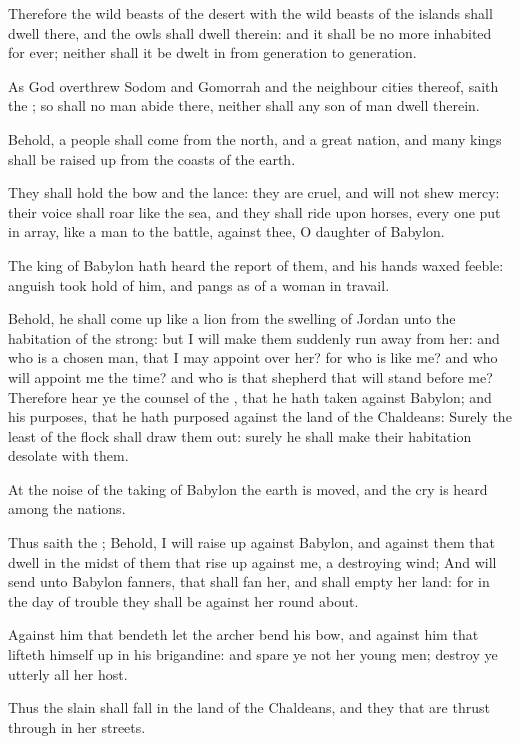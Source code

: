 \Verse Therefore the wild beasts of the desert with the wild beasts of the islands shall dwell there, and the owls shall dwell therein: and it shall be no more inhabited for ever; neither shall it be dwelt in from generation to generation.

\Verse As God overthrew Sodom and Gomorrah and the neighbour cities thereof, saith the \LORD; so shall no man abide there, neither shall any son of man dwell therein.

\Verse Behold, a people shall come from the north, and a great nation, and many kings shall be raised up from the coasts of the earth.

\Verse They shall hold the bow and the lance: they are cruel, and will not shew mercy: their voice shall roar like the sea, and they shall ride upon horses, every one put in array, like a man to the battle, against thee, O daughter of Babylon.

\Verse The king of Babylon hath heard the report of them, and his hands waxed feeble: anguish took hold of him, and pangs as of a woman in travail.

\Verse Behold, he shall come up like a lion from the swelling of Jordan unto the habitation of the strong: but I will make them suddenly run away from her: and who is a chosen man, that I may appoint over her?  for who is like me? and who will appoint me the time? and who is that shepherd that will stand before me?  \Verse Therefore hear ye the counsel of the \LORD, that he hath taken against Babylon; and his purposes, that he hath purposed against the land of the Chaldeans: Surely the least of the flock shall draw them out: surely he shall make their habitation desolate with them.

\Verse At the noise of the taking of Babylon the earth is moved, and the cry is heard among the nations.


\Chapter
\Verse Thus saith the \LORD; Behold, I will raise up against Babylon, and against them that dwell in the midst of them that rise up against me, a destroying wind; \Verse And will send unto Babylon fanners, that shall fan her, and shall empty her land: for in the day of trouble they shall be against her round about.

\Verse Against him that bendeth let the archer bend his bow, and against him that lifteth himself up in his brigandine: and spare ye not her young men; destroy ye utterly all her host.

\Verse Thus the slain shall fall in the land of the Chaldeans, and they that are thrust through in her streets.

